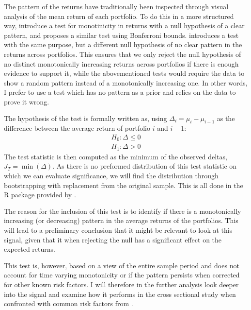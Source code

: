 The pattern of the returns have traditionally been inspected through visual analysis of the mean return of each portfolio. To do this in a more structured way, \cite{wolak1987exact, wolak1989testing} introduce a test for monotinicity in returns with a null hypothesis of a clear pattern, and \cite{fama1984term} proposes a similar test using Bonferroni bounds. \cite{patton2010monotonicity} introduces a test with the same purpose, but a different null hypothesis of no clear pattern in the returns across portfolios. This ensures that we only reject the null hypothesis of no distinct monotonically increasing returns across portfolios if there is enough evidence to support it, while the abovementioned tests would require the data to show a random pattern instead of a monotonically increasing one. In other words, I prefer to use a test which has no pattern as a prior and relies on the data to prove it wrong.

The hypothesis of the \cite{patton2010monotonicity} test is formally written as, using $\Delta_{i} = \mu _{i} - \mu_{i-1}$ as the difference between the average return of portfolio $i$ and $i-1$:
\begin{equation}
	\begin{array}{c}
		H_{0}:\Delta\leq0\\
		H_{1}:\Delta>0
	\end{array}
	\label{eq:monoton_test}
\end{equation}
The test statistic is then computed as the minimum of the observed deltas, $J_{T} = \min \left( \Delta \right)$. As there is no preformed distribution of this test statistic on which we can evaluate significance, we will find the distribution through bootstrapping with replacement from the original sample. This is all done in the R package provided by \cite{rpackagemonotonicity}. 

The reason for the inclusion of this test is to identify if there is a monotonically increasing (or decreasing) pattern in the average returns of the portfolios. This will lead to a preliminary conclusion that it might be relevant to look at this signal, given that it when rejecting the null has a significant effect on the expected returns. 

This test is, however, based on a view of the entire sample period and does not account for time varying monotonicity or if the pattern persists when corrected for other known risk factors. I will therefore in the further analysis look deeper into the signal and examine how it performs in the cross sectional study when confronted with common risk factors from \cite{fama2015five}.

